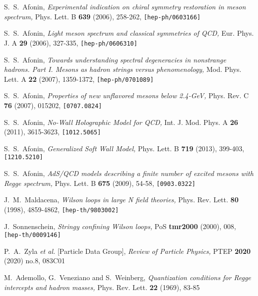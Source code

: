 \documentclass[a4paper,11pt]{article}
\begin{document}
\begin{thebibliography}{99}
  S.~S.~Afonin,
  \textit{Experimental indication on chiral symmetry restoration in meson spectrum,}
  Phys. Lett. B \textbf{639} (2006), 258-262,
  \texttt{[hep-ph/0603166]}

  S.~S.~Afonin,
  \textit{Light meson spectrum and classical symmetries of QCD,}
  Eur. Phys. J. A \textbf{29} (2006), 327-335,
  \texttt{[hep-ph/0606310]}

  S.~S.~Afonin,
  \textit{Towards understanding spectral degeneracies in nonstrange hadrons. Part I. Mesons as hadron strings versus phenomenology,}
  Mod. Phys. Lett. A \textbf{22} (2007), 1359-1372,
  \texttt{[hep-ph/0701089]}

  S.~S.~Afonin,
  \textit{Properties of new unflavored mesons below 2.4-GeV,}
  Phys. Rev. C \textbf{76} (2007), 015202,
  \texttt{[0707.0824]}

  S.~S.~Afonin,
  \textit{No-Wall Holographic Model for QCD,}
  Int. J. Mod. Phys. A \textbf{26} (2011), 3615-3623,
  \texttt{[1012.5065]}

  S.~S.~Afonin,
  \textit{Generalized Soft Wall Model,}
  Phys. Lett. B \textbf{719} (2013), 399-403,
  \texttt{[1210.5210]}

  S.~S.~Afonin,
  \textit{AdS/QCD models describing a finite number of excited mesons with Regge spectrum,}
  Phys. Lett. B \textbf{675} (2009), 54-58,
  \texttt{[0903.0322]}

  J.~M.~Maldacena,
  \textit{Wilson loops in large N field theories,}
  Phys. Rev. Lett. \textbf{80} (1998), 4859-4862,
  \texttt{[hep-th/9803002]}

  J.~Sonnenschein,
  \textit{Stringy confining Wilson loops,}
  PoS \textbf{tmr2000} (2000), 008,
  \texttt{[hep-th/0009146]}

  P.~A.~Zyla \textit{et al.} [Particle Data Group],
  \textit{Review of Particle Physics,}
  PTEP \textbf{2020} (2020) no.8, 083C01

  M.~Ademollo, G.~Veneziano and S.~Weinberg,
  \textit{Quantization conditions for Regge intercepts and hadron masses,}
  Phys. Rev. Lett. \textbf{22} (1969), 83-85


\end{thebibliography}
\end{document}
